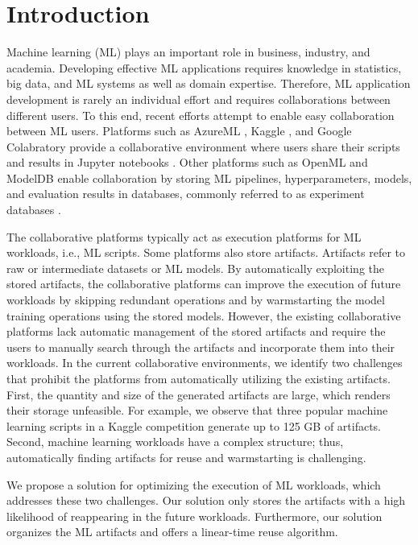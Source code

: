 \section{Introduction} \label{sec-introduction}
Machine learning (ML) plays an important role in business, industry, and academia. 
Developing effective ML applications requires knowledge in statistics, big data, and ML systems as well as domain expertise.
Therefore, ML application development is rarely an individual effort and requires collaborations between different users.
To this end, recent efforts attempt to enable easy collaboration between ML users.
Platforms such as AzureML \cite{team2016azureml}, Kaggle \cite{kagglewebsite}, and Google Colabratory \cite{googlecolab} provide a collaborative environment where users share their scripts and results in Jupyter notebooks \cite{Kluyver:2016aa}.
Other platforms such as OpenML \cite{vanschoren2014openml} and ModelDB \cite{vartak2016m} enable collaboration by storing ML pipelines, hyperparameters, models, and evaluation results in databases, commonly referred to as experiment databases \cite{Vanschoren2012}.

The collaborative platforms typically act as execution platforms for ML workloads, i.e., ML scripts.
Some platforms also store artifacts.
Artifacts refer to raw or intermediate datasets or ML models.
By automatically exploiting the stored artifacts, the collaborative platforms can improve the execution of future workloads by skipping redundant operations and by warmstarting the model training operations using the stored models.
However, the existing collaborative platforms lack automatic management of the stored artifacts and require the users to manually search through the artifacts and incorporate them into their workloads.
In the current collaborative environments, we identify two challenges that prohibit the platforms from automatically utilizing the existing artifacts.
First, the quantity and size of the generated artifacts are large, which renders their storage unfeasible.
For example, we observe that three popular machine learning scripts in a Kaggle competition generate up to 125 GB of artifacts.
Second, machine learning workloads have a complex structure; thus, automatically finding artifacts for reuse and warmstarting is challenging.

We propose a solution for optimizing the execution of ML workloads, which addresses these two challenges.
Our solution only stores the artifacts with a high likelihood of reappearing in the future workloads.
Furthermore, our solution organizes the ML artifacts and offers a linear-time reuse algorithm.

